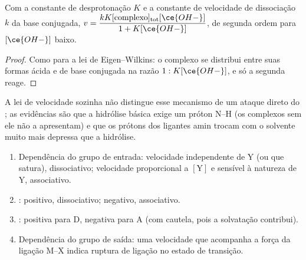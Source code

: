 \begin{proposition}\label{prop:b3:complex-mechanisms:conjugate-base}
Com a constante de desprotonação $K$ e a constante de velocidade de dissociação $k$ da
base conjugada, $v = \dfrac{kK[\text{complexo}]_{\mathrm{tot}}[\ce{OH-}]}{1 + K[\ce{OH-}]}$, de segunda ordem para $[\ce{OH-}]$ baixo.
\end{proposition}

\begin{proof}
Como para a lei de Eigen--Wilkins: o complexo se distribui entre suas formas ácida e
de base conjugada na razão $1 : K[\ce{OH-}]$, e só a segunda reage.
\end{proof}

A lei de velocidade sozinha não distingue esse mecanismo de um ataque direto do
; as evidências são que a hidrólise básica exige um próton N--H (os complexos sem
ele não a apresentam) e que os prótons dos ligantes amin trocam com o solvente muito
mais depressa que a hidrólise.

\begin{method}\label{met:b3:complex-mechanisms:diagnose}
\begin{enumerate}
  \item Dependência do grupo de entrada: velocidade independente de Y (ou que satura),
        dissociativo; velocidade proporcional a $[\mathrm Y]$ e sensível à natureza de Y,
        associativo.
  \item {}: positivo, dissociativo; negativo, associativo.
  \item {}: positiva para D, negativa para A (com cautela, pois a
        solvatação contribui).
  \item Dependência do grupo de saída: uma velocidade que acompanha a força da ligação M--X
        indica ruptura de ligação no estado de transição.
\end{enumerate}
\end{method}

